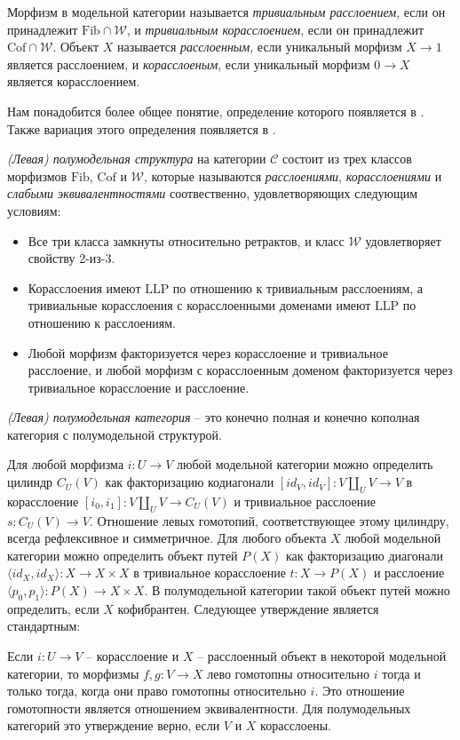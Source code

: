 \documentclass[reqno]{amsart}
\theoremstyle{definition}
\theoremstyle{remark}
\newcommand{\cat}[1]{\mathcal{#1}}
\renewcommand{\C}{\cat{C}}
\newcommand{\we}{\mathcal{W}}
\newcommand{\fib}{\mathrm{Fib}}
\newcommand{\cof}{\mathrm{Cof}}
\newcommand{\cyli}{i}
\begin{document}
Морфизм в модельной категории называется \emph{тривиальным расслоением}, если он принадлежит $\fib \cap \we$, и \emph{тривиальным корасслоением}, если он принадлежит $\cof \cap \we$.
Объект $X$ называется \emph{расслоенным}, если уникальный морфизм $X \to 1$ является расслоением, и \emph{корасслоеным}, если уникальный морфизм $0 \to X$ является корасслоением.

Нам понадобится более общее понятие, определение которого появляется в \cite{semi-model,barwick-semi}.
Также вариация этого определения появляется в \cite[Theorem~3.3]{hovey-semi}.

\begin{defn}
\emph{(Левая) полумодельная структура} на категории $\C$ состоит из трех классов морфизмов $\fib$, $\cof$ и $\we$,
которые называются \emph{расслоениями}, \emph{корасслоениями} и \emph{слабыми эквивалентностями} соотвественно, удовлетворяющих следующим условиям:
\begin{itemize}
\item Все три класса замкнуты относительно ретрактов, и класс $\we$ удовлетворяет свойству 2-из-3.
\item Корасслоения имеют LLP по отношению к тривиальным расслоениям, а тривиальные корасслоения с корасслоенными доменами имеют LLP по отношению к расслоениям.
\item Любой морфизм факторизуется через корасслоение и тривиальное расслоение, и любой морфизм с корасслоенным доменом факторизуется через тривиальное корасслоение и расслоение.
\end{itemize}
\emph{(Левая) полумодельная категория} -- это конечно полная и конечно кополная категория с полумодельной структурой.
\end{defn}

Для любой морфизма $i : U \to V$ любой модельной категории можно определить цилиндр $C_U(V)$ как факторизацию кодиагонали $[id_V,id_V] : V \amalg_U V \to V$ в корасслоение $[\cyli_0,\cyli_1] : V \amalg_U V \to C_U(V)$ и тривиальное расслоение $s : C_U(V) \to V$.
Отношение левых гомотопий, соответствующее этому цилиндру, всегда рефлексивное и симметричное.
Для любого объекта $X$ любой модельной категории можно определить объект путей $P(X)$ как факторизацию диагонали $\langle id_X, id_X \rangle : X \to X \times X$ в тривиальное корасслоение $t : X \to P(X)$ и расслоение $\langle p_0, p_1 \rangle : P(X) \to X \times X$.
В полумодельной категории такой объект путей можно определить, если $X$ кофибрантен.
Следующее утверждение является стандартным:
\begin{prop}
Если $i : U \to V$ -- корасслоение и $X$ -- расслоенный объект в некоторой модельной категории, то морфизмы $f,g : V \to X$ лево гомотопны относительно $i$ тогда и только тогда, когда они право гомотопны относительно $i$.
Это отношение гомотопности является отношением эквивалентности.
Для полумодельных категорий это утверждение верно, если $V$ и $X$ корасслоены.
\end{prop}
\end{document}
